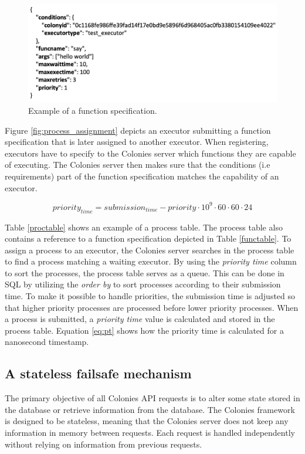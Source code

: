 \documentclass{article}
\begin{document}
\begin{figure}[h]
	\centering
    \includegraphics[scale=0.35]{function_spec.png}
	\caption{Example of a function specification.}
	\label{fig:function_spec}
\end{figure}

Figure \ref{fig:process_assignment} depicts an executor submitting a function specification that is later assigned to another executor. When registering, executors have to specify to the Colonies server which functions they are capable of executing. The Colonies server then makes sure that the conditions (i.e requirements) part of the function specification matches the capability of an executor. 

\begin{equation}
    \label{eq:pt}
    priority_{time}=submission_{time} - priority \cdot 10^9 \cdot 60 \cdot 60 \cdot 24
\end{equation}

Table \ref{proctable} shows an example of a process table. The process table also contains a reference to a function specification depicted in Table \ref{functable}. To assign a process to an executor, the Colonies server searches in the process table to find a process matching a waiting executor. By using the \emph{priority time} column to sort the processes, the process table serves as a queue. This can be done in SQL by utilizing the \emph{order by} to sort processes according to their submission time. To make it possible to handle priorities, the submission time is adjusted so that higher priority processes are processed before lower priority processes. When a process is submitted, a \emph{priority time} value is calculated and stored in the process table. Equation \ref{eq:pt} shows how the priority time is calculated for a nanosecond timestamp. 

\subsection{A stateless failsafe mechanism}
The primary objective of all Colonies API requests is to alter some state stored in the database or retrieve information from the database. The Colonies framework is designed to be stateless, meaning that the Colonies server does not keep any information in memory between requests. Each request is handled independently without relying on information from previous requests. 
\end{document}
